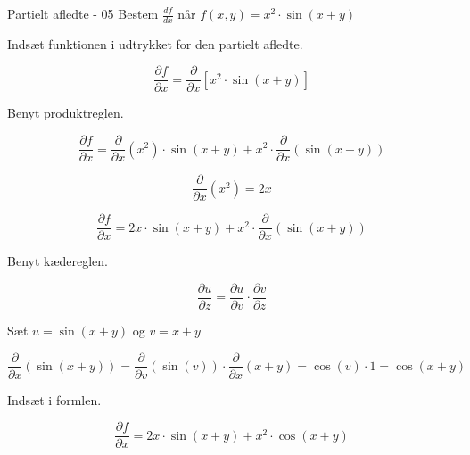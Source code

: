\documentclass{article}
\begin{document}
\begin{exercise}{Partielt afledte - 05}
Bestem $\frac{df}{dx}$ når $f(x,y) = x^2 \cdot \sin(x + y)$


\hint
Indsæt funktionen i udtrykket for den partielt afledte.

\hint

\[
\frac{\partial f}{\partial x} = \frac{\partial }{\partial x} \left[ x^2 \cdot \sin(x + y) \right]
\]

\hint

Benyt produktreglen.

\hint
\[
\frac{\partial f}{\partial x} = \frac{\partial }{\partial x}\left(x^2 \right) \cdot \sin(x + y)+ x^2 \cdot \frac{\partial}{\partial x} \left( \sin(x + y)\right)
\]

\hint
\[\frac{\partial }{\partial x} \left(x^2\right) = 2x
\]

\hint
\[
\frac{\partial f}{\partial x} = 2x \cdot \sin(x + y)+ x^2 \cdot \frac{\partial}{\partial x} \left( \sin(x + y)\right)
\]

\hint
Benyt kædereglen.

\hint
\[
\frac{\partial u}{\partial z} = \frac{\partial u}{\partial v} \cdot \frac{\partial v}{\partial z}
\]

\hint
Sæt $u=\sin(x + y)$ og $v = x + y$

\hint
\[
\frac{\partial}{\partial x} \left( \sin(x + y)\right) = \frac{\partial}{\partial v} \left( \sin(v) \right) \cdot \frac{\partial}{\partial x} (x + y) = \cos(v) \cdot 1 = \cos(x + y)
\]

\hint
Indsæt i formlen.

\hint
\[
\frac{\partial f}{\partial x} = 2x \cdot \sin(x + y)+ x^2 \cdot \cos(x + y)
\]


\end{exercise}

\newpage
\end{document}
